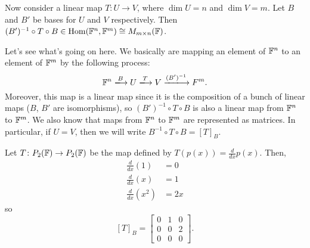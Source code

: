 Now consider a linear map $T\colon U \to V$, where $\dim U = n$ and $\dim V = m$. Let $B$ and $B'$ be bases for $U$ and $V$ respectively. Then $(B')^{-1} \circ T \circ B \in \operatorname{Hom}(\mathbb{F}^n, \mathbb{F}^m) \cong M_{m\times n}(\mathbb{F})$.

Let's see what's going on here. We basically are mapping an element of $\mathbb{F}^{n}$ to an element of $\mathbb{F}^{m}$ by the following process: \[
  \F^{n} \xlongrightarrow{B} U \xlongrightarrow{T} V \xlongrightarrow{(B')^{-1}} F^{m}.
\] 
Moreover, this map is a linear map since it is the composition of a bunch of linear maps ($B$, $B'$ are isomorphisms), so $(B')^{-1}\circ T \circ B$ is also a linear map from $\mathbb{F}^{n}$ to $\mathbb{F}^{m}$. We also know that maps from $\mathbb{F}^{n}$ to $\mathbb{F}^{m}$ are represented as matrices. In particular, if $U = V$, then we will write $B^{-1} \circ T \circ B = [T]_B$.

\begin{example}
  Let $T\colon P_2(\mathbb{F}) \to P_2(\mathbb{F})$ be the map defined by $T(p(x)) = \frac{d}{dx} p(x)$. Then, 
  \begin{align*}
    \frac{d}{dx} (1) &= 0 \\
    \frac{d}{dx} (x) &= 1 \\
    \frac{d}{dx} (x^2) &= 2x
  \end{align*}
  so \[
    [T]_B = 
    \begin{bmatrix}
      0 & 1 & 0 \\
      0 & 0 & 2 \\
      0 & 0 & 0
    \end{bmatrix}.
  \] 
\end{example}


